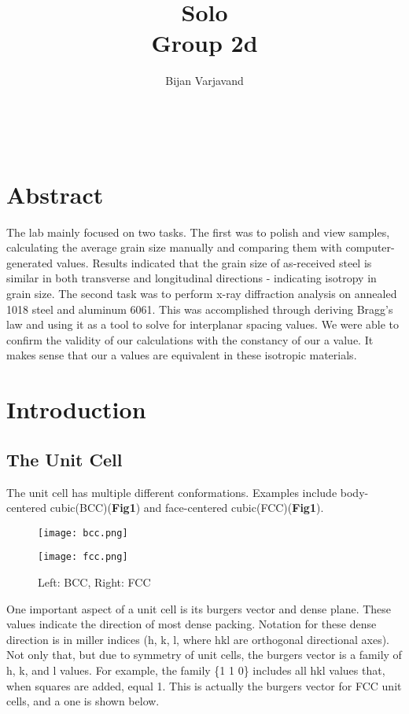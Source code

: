 \documentclass{article}
\author{Bijan Varjavand}
\title{Solo\\Group 2d}
\begin{document}
\maketitle
\ \\[2.5in]

\section{Abstract}
\centering
The lab mainly focused on two tasks. The first was to polish and view samples, calculating the average grain size manually and comparing them with computer-generated values. Results indicated that the grain size of as-received steel is similar in both transverse and longitudinal directions - indicating isotropy in grain size. The second task was to perform x-ray diffraction analysis on annealed 1018 steel and aluminum 6061. This was accomplished through deriving Bragg's law and using it as a tool to solve for interplanar spacing values. We were able to confirm the validity of our calculations with the constancy of our a value. It makes sense that our a values are equivalent in these isotropic materials.

\clearpage

\raggedright
\section{Introduction}

\subsection{The Unit Cell}

The unit cell has multiple different conformations. Examples include body-centered cubic(BCC)(\textbf{Fig1}) and face-centered cubic(FCC)(\textbf{Fig1}).

\begin{figure}[h]
	\begin{minipage}{0.5\textwidth}
		\centering
		\texttt{[image: bcc.png]}
	\end{minipage}
	\begin{minipage}{0.5\textwidth}
		\centering
		\texttt{[image: fcc.png]}
	\end{minipage}
	\caption{Left: BCC, Right: FCC}
\end{figure}

One important aspect of a unit cell is its burgers vector and dense plane. These values indicate the direction of most dense packing. Notation for these dense direction is in miller indices (h, k, l, where hkl are orthogonal directional axes). Not only that, but due to symmetry of unit cells, the burgers vector is a family of h, k, and l values. For example, the family \{1 1 0\} includes all hkl values that, when squares are added, equal 1. This is actually the burgers vector for FCC unit cells, and a one is shown below.
\end{document}
